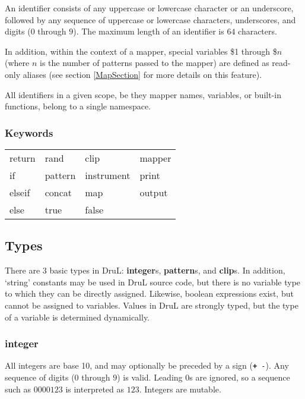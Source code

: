 An identifier consists of any uppercase or lowercase character
or an underscore, followed by any sequence of uppercase or lowercase characters,
underscores, and digits ($0$ through $9$). The maximum length of an identifier
is $64$ characters.

In addition, within the context of a mapper, special variables \$1 through \$$n$ (where $n$ is the number of patterns passed to the mapper) are defined as read-only aliases (see section \ref{MapSection} for more details on this feature).

All identifiers in a given scope, be they mapper names, variables, or built-in functions, belong to a single namespace.

\subsubsection{Keywords}

\begin{table}[htb]
\begin{center} 
\begin{tabular}{llll} 
  return   & rand    & clip       & mapper \\
  if     & pattern & instrument & print  \\
  elseif & concat  & map     & output \\
  else   & true    & false &
\end{tabular}
\label{tab:keywords}
\end{center} 
\end{table}



\subsection{Types}

There are $3$ basic types in DruL: \textbf{integer}s, \textbf{pattern}s,
and \textbf{clip}s.  In addition, `string' constants may be used in DruL source code, but there is no variable type to which they can be directly assigned.
Likewise, boolean expressions exist, but cannot be assigned to variables.
Values in DruL are strongly typed, but the type of a variable is determined dynamically.

\subsubsection{integer}

All integers are base 10, and may optionally be preceded by a sign ({\tt \textbf + -}).
Any sequence of digits ($0$ through $9$) is valid.  Leading $0$s are ignored, so a sequence such as $0000123$  is interpreted as $123$.  Integers are mutable.

